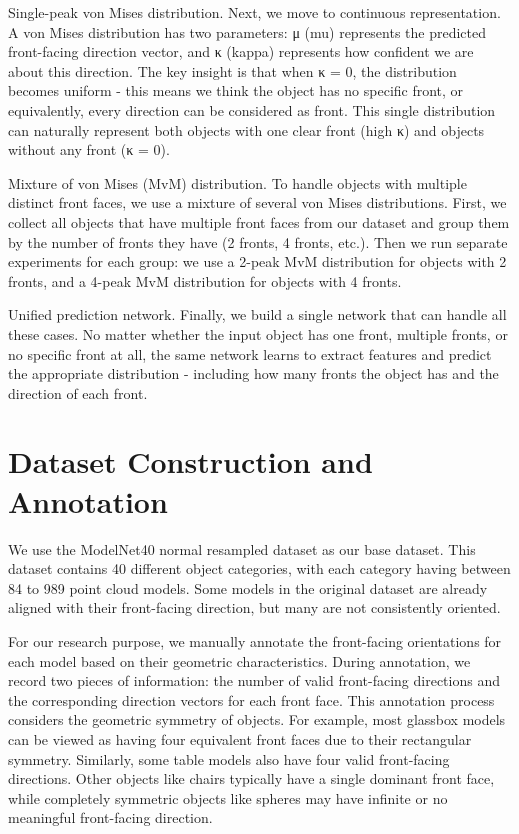 Single-peak von Mises distribution. Next, we move to continuous representation. A von Mises distribution has two parameters: μ (mu) represents the predicted front-facing direction vector, and κ (kappa) represents how confident we are about this direction. The key insight is that when κ = 0, the distribution becomes uniform - this means we think the object has no specific front, or equivalently, every direction can be considered as front. This single distribution can naturally represent both objects with one clear front (high κ) and objects without any front (κ = 0).

Mixture of von Mises (MvM) distribution. To handle objects with multiple distinct front faces, we use a mixture of several von Mises distributions. First, we collect all objects that have multiple front faces from our dataset and group them by the number of fronts they have (2 fronts, 4 fronts, etc.). Then we run separate experiments for each group: we use a 2-peak MvM distribution for objects with 2 fronts, and a 4-peak MvM distribution for objects with 4 fronts. 

Unified prediction network. Finally, we build a single network that can handle all these cases. No matter whether the input object has one front, multiple fronts, or no specific front at all, the same network learns to extract features and predict the appropriate distribution - including how many fronts the object has and the direction of each front. 
\section{Dataset Construction and Annotation}
We use the ModelNet40 normal resampled dataset as our base dataset. This dataset contains 40 different object categories, with each category having between 84 to 989 point cloud models. Some models in the original dataset are already aligned with their front-facing direction, but many are not consistently oriented.

For our research purpose, we manually annotate the front-facing orientations for each model based on their geometric characteristics. During annotation, we record two pieces of information: the number of valid front-facing directions and the corresponding direction vectors for each front face. This annotation process considers the geometric symmetry of objects. For example, most glassbox models can be viewed as having four equivalent front faces due to their rectangular symmetry. Similarly, some table models also have four valid front-facing directions. Other objects like chairs typically have a single dominant front face, while completely symmetric objects like spheres may have infinite or no meaningful front-facing direction.

